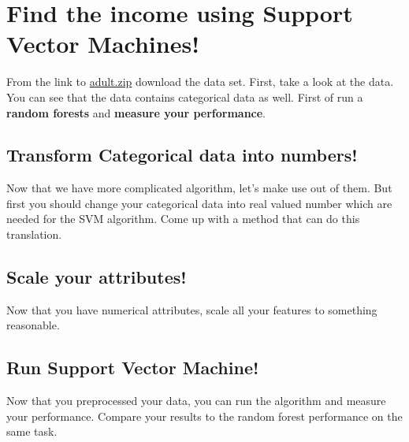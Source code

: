 \documentclass[12pt,letterpaper]{article}
\begin{document}
\section*{Find the income using Support Vector Machines!}
From the link to \href{https://abtinshahidi.github.io/files/adult.zip}{adult.zip} download the data set. First, take a look at the data. You can see that the data contains categorical data as well. First of run a \textbf{random forests} and \textbf{measure your performance}. 


\subsection*{Transform Categorical data into numbers!}
 Now that we have more complicated algorithm, let's make use out of them. But first you should change your categorical data into real valued number which are needed for the SVM algorithm. Come up with a method that can do this translation. 

\subsection*{Scale your attributes!}
 Now that you have numerical attributes, scale all your features to something reasonable.
 

\subsection*{Run Support Vector Machine!}
Now that you preprocessed your data, you can run the algorithm and measure your performance. Compare your results to the random forest performance on the same task.
\end{document}
